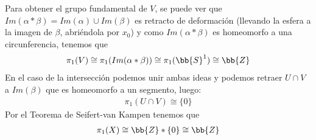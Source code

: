 \begin{ejemplo}
\begin{enumerate}
\begin{figure}[ht]
        \end{figure}
        Para obtener el grupo fundamental de $V$, se puede ver que $Im(\alpha \ast \beta) = Im(\alpha)\cup Im(\beta)$ es retracto de deformación (llevando la esfera a la imagen de $\beta$, abriéndola por $x_0$) y como $Im(\alpha \ast \beta)$ es homeomorfo a una circunferencia, tenemos que 
        \begin{gather*}
            \pi_1(V) \cong \pi_1(Im(\alpha \ast \beta)) \cong \pi_1(\bb{S}^1) \cong \bb{Z}
        \end{gather*}
        En el caso de la intersección podemos unir ambas ideas y podemos retraer $U\cap V$ a $Im(\beta)$ que es homeomorfo a un segmento, luego:
        \begin{gather*}
            \pi_1(U\cap V) \cong \{0\}
        \end{gather*}
        Por el Teorema de Seifert-van Kampen tenemos que 
        \begin{gather*}
            \pi_1(X)\cong \bb{Z}\ast \{0\}\cong \bb{Z}
        \end{gather*}
    \end{enumerate}
\end{ejemplo}

